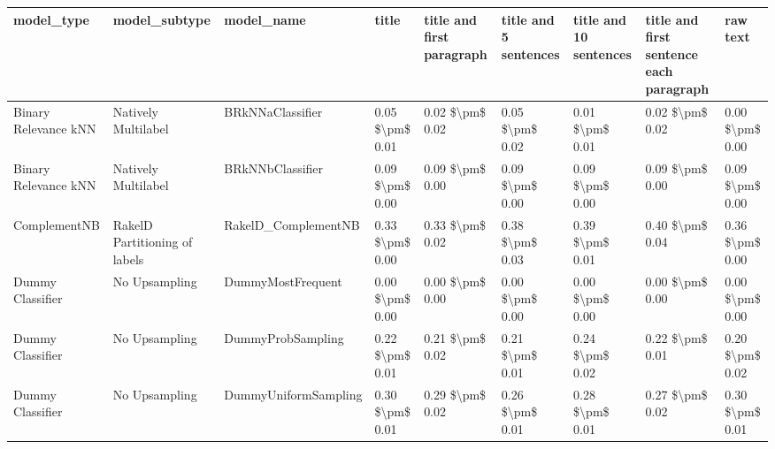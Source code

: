 \begin{tabular}{lllllllll}
\toprule
                     model\_type &                 model\_subtype &                                   model\_name &           title & title and first paragraph & title and 5 sentences & title and 10 sentences & title and first sentence each paragraph &            raw text \\
\midrule
           Binary Relevance kNN &           Natively Multilabel &                             BRkNNaClassifier & 0.05 \$\textbackslash pm\$ 0.01 &           0.02 \$\textbackslash pm\$ 0.02 &       0.05 \$\textbackslash pm\$ 0.02 &        0.01 \$\textbackslash pm\$ 0.01 &                         0.02 \$\textbackslash pm\$ 0.02 &     0.00 \$\textbackslash pm\$ 0.00 \\
           Binary Relevance kNN &           Natively Multilabel &                             BRkNNbClassifier & 0.09 \$\textbackslash pm\$ 0.00 &           0.09 \$\textbackslash pm\$ 0.00 &       0.09 \$\textbackslash pm\$ 0.00 &        0.09 \$\textbackslash pm\$ 0.00 &                         0.09 \$\textbackslash pm\$ 0.00 &     0.09 \$\textbackslash pm\$ 0.00 \\
                   ComplementNB & RakelD Partitioning of labels &                          RakelD\_ComplementNB & 0.33 \$\textbackslash pm\$ 0.00 &           0.33 \$\textbackslash pm\$ 0.02 &       0.38 \$\textbackslash pm\$ 0.03 &        0.39 \$\textbackslash pm\$ 0.01 &                         0.40 \$\textbackslash pm\$ 0.04 &     0.36 \$\textbackslash pm\$ 0.00 \\
               Dummy Classifier &                 No Upsampling &                            DummyMostFrequent & 0.00 \$\textbackslash pm\$ 0.00 &           0.00 \$\textbackslash pm\$ 0.00 &       0.00 \$\textbackslash pm\$ 0.00 &        0.00 \$\textbackslash pm\$ 0.00 &                         0.00 \$\textbackslash pm\$ 0.00 &     0.00 \$\textbackslash pm\$ 0.00 \\
               Dummy Classifier &                 No Upsampling &                            DummyProbSampling & 0.22 \$\textbackslash pm\$ 0.01 &           0.21 \$\textbackslash pm\$ 0.02 &       0.21 \$\textbackslash pm\$ 0.01 &        0.24 \$\textbackslash pm\$ 0.02 &                         0.22 \$\textbackslash pm\$ 0.01 &     0.20 \$\textbackslash pm\$ 0.02 \\
               Dummy Classifier &                 No Upsampling &                         DummyUniformSampling & 0.30 \$\textbackslash pm\$ 0.01 &           0.29 \$\textbackslash pm\$ 0.02 &       0.26 \$\textbackslash pm\$ 0.01 &        0.28 \$\textbackslash pm\$ 0.01 &                         0.27 \$\textbackslash pm\$ 0.02 &     0.30 \$\textbackslash pm\$ 0.01 \\

\end{tabular}
